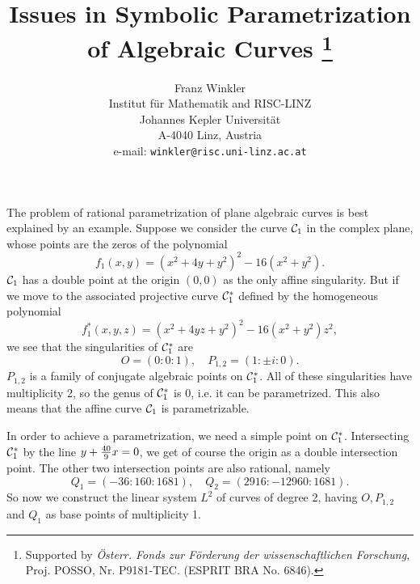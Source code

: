 \oddsidemargin -7mm
\evensidemargin -7mm
\topmargin -05mm
\headheight 0pt
\headsep 0pt
\textheight 235mm
\textwidth 174mm
\pagestyle{empty}



\title{Issues in Symbolic Parametrization \\
       of Algebraic Curves 
\footnote{Supported by 
{\it \"Osterr. Fonds zur F\"orderung der wissenschaftlichen
Forschung}, Proj. POSSO, Nr. P9181-TEC. (ESPRIT BRA No. 6846).}  }

\author{Franz  Winkler \\
        Institut f\"ur Mathematik and RISC-LINZ \\
        Johannes Kepler Universit\"at \\
        A-4040 Linz, Austria \\
        e-mail: {\tt winkler@risc.uni-linz.ac.at}}

\date{ }

\maketitle

\thispagestyle{empty}

\vspace{5 mm}

\noindent {}

\vspace{5 mm}

The problem of rational parametrization of plane algebraic curves is best
explained by an example. 
Suppose we consider the curve ${\cal C}_1$ in the complex plane, whose
points are the zeros of the polynomial
$$f_1(x,y) = (x^2+4y+y^2)^2 - 16(x^2+y^2).$$
${\cal C}_1$ has a double point at the origin $(0,0)$ as the 
only affine singularity. But if we move to the associated projective
curve ${\cal C}_1^*$ defined by the homogeneous polynomial 
$$f_1^*(x,y,z)= (x^2+4yz+y^2)^2-16(x^2+y^2)z^2,$$
we see that the singularities of ${\cal C}_1^*$ are
$$O=(0:0:1), \quad P_{1,2}= (1:\pm i:0).$$
$P_{1,2}$ is a family of conjugate algebraic points on ${\cal C}_1^*$.
All of these singularities have multiplicity 2, so the genus of
${\cal C}_1^*$ is 0, i.e. it can be parametrized.
This also means that the affine curve ${\cal C}_1$ is parametrizable.

In order to achieve a parametrization, we need a simple point on
${\cal C}_1^*$.
Intersecting ${\cal C}_1^*$ by the line $y+{40\over 9}x=0$, we get of
course the origin as a double intersection point. The other two
intersection points are also rational, namely
$$Q_1=(-36 : 160 : 1681), \quad Q_2=(2916:-12960:1681).$$
So now we construct the linear system $L^2$ of curves of degree 2, having
$O, P_{1,2}$ and $Q_1$ as base points of multiplicity 1.

